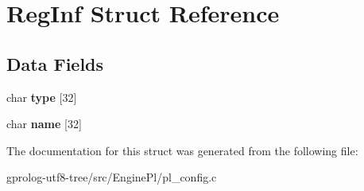 \hypertarget{structRegInf}{}\section{Reg\+Inf Struct Reference}
\label{structRegInf}
\subsection*{Data Fields}
\begin{DoxyCompactItemize}
\item 
char {\bfseries type} \mbox{[}32\mbox{]}\hypertarget{structRegInf_ac0222d4bcdce57bdcd74c2d45b9dfeb5}{}\label{structRegInf_ac0222d4bcdce57bdcd74c2d45b9dfeb5}

\item 
char {\bfseries name} \mbox{[}32\mbox{]}\hypertarget{structRegInf_af767d5a12d9d8e248f6c3eae99802e73}{}\label{structRegInf_af767d5a12d9d8e248f6c3eae99802e73}

\end{DoxyCompactItemize}


The documentation for this struct was generated from the following file\+:\begin{DoxyCompactItemize}
\item 
gprolog-\/utf8-\/tree/src/\+Engine\+Pl/pl\+\_\+config.\+c\end{DoxyCompactItemize}
